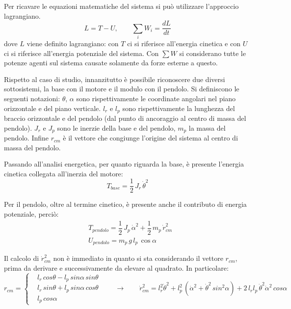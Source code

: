 \documentclass[11pt]{article}
\begin{document}
Per ricavare le equazioni matematiche del sistema si può utilizzare l'approccio lagrangiano. 
\begin{equation}
	L = T - U, \qquad \sum_{i}^{} W_i = \dfrac{dL}{dt}
\end{equation}
dove $L$ viene definito lagrangiano: con $T$ ci si riferisce all'energia cinetica e con $U$ ci si riferisce all'energia potenziale del sistema. Con $\sum W$ si considerano tutte le potenze agenti sul sistema causate solamente da forze esterne a questo. 


Rispetto al caso di studio, innanzitutto è possibile riconoscere due diversi sottosistemi, la base con il motore e il modulo con il pendolo. Si definiscono le seguenti notazioni: $\theta$, $\alpha$ sono rispettivamente le coordinate angolari nel piano orizzontale e del piano verticale. $l_r$ e $l_p$ sono rispettivamente la lunghezza del braccio orizzontale e del pendolo (dal punto di ancoraggio al centro di massa del pendolo). $J_r$ e $J_p$ sono le inerzie della base e del pendolo, $m_p$ la massa del pendolo. Infine $r_{cm}$ è il vettore che congiunge l'origine del sistema al centro di massa del pendolo.

Passando all'analisi energetica, per quanto riguarda la base, è presente l'energia cinetica collegata all'inerzia del motore:
\begin{equation}
    T_{base} = \dfrac{1}{2} \, J_r \, \dot{\theta}^2
\end{equation}

Per il pendolo, oltre al termine cinetico, è presente anche il contributo di energia potenziale, perciò:
\begin{equation}
	\begin{aligned}
		&T_{pendolo} = \dfrac{1}{2} \, J_p \, \dot{\alpha}^2 + \dfrac{1}{2} \, m_p \, \dot{r}_{cm}^2\\
		&U_{pendolo} = m_p \, g\, l_p\, \cos\alpha 
	\end{aligned}
\end{equation}

Il calcolo di $\dot{r}_{cm}^2$ non è immediato in quanto si sta considerando il vettore $r_{cm}$, prima da derivare e successivamente da elevare al quadrato. In particolare: 
\begin{equation}
	r_{cm} = 
	\left\{
	\begin{aligned}
		&l_r \, cos\theta - l_p\,sin\alpha\,sin\theta \\
		&l_r \, sin\theta + l_p\,sin\alpha\,cos\theta \\
		&l_p\,cos\alpha
	\end{aligned}
	\right.
	\qquad\rightarrow\qquad
	\dot{r}_{cm}^2 = l_r^2\dot{\theta}^2 + l_p^2\,(\dot{\alpha}^2 + \dot{\theta}^2\,sin^2\alpha) + 2\,l_rl_p\,\dot{\theta}^2\dot{\alpha}^2\,cos\alpha
\end{equation}
\end{document}
